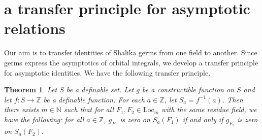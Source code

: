\documentclass[12pt]{amsart}
\newcommand{\ring}[1]{{\mathbb #1}}
\newcommand{\Loc}{\mathrm{Loc}}
\theoremstyle{plain}
\newtheorem{theorem}[thm]{Theorem}
\theoremstyle{definition}
\begin{document}
\section{a transfer principle for asymptotic relations}

Our aim is to transfer identities of Shalika germs from
one field to another.  Since germs express the asymptotics of
orbital integrals, we develop a transfer principle for
asymptotic identities.  We have the following transfer principle.

\begin{theorem} 
Let $S$ be a definable set.    
Let $g$ be a constructible function on $S$ and let
  $f:S\to \ring{Z}$ be a definable function.  For each $a\in\ring{Z}$,
let $S_a = f^{-1}(a)$.  Then there exists 
  $m\in\ring{N}$ such that for all $F_1,F_2\in\Loc_m$ with the same
  residue field, we have the following: for all $a\in\ring{Z}$, 
  $g_{F_1}$ is zero on $S_a(F_1)$ if and only if $g_{F_2}$ is zero
  on $S_a(F_2)$.
\end{theorem}
\end{document}
